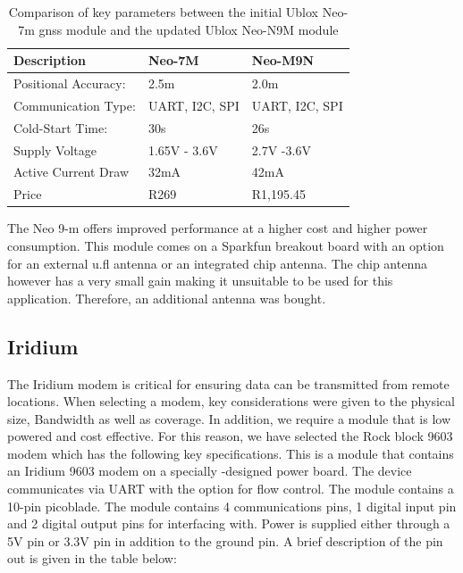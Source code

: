 \begin{table}[H]
    \centering
    \caption{Comparison of key parameters between the initial Ublox Neo-7m gnss module and the updated Ublox Neo-N9M module}
    \begin{tabular}{|l |l |l|}
    \hline
        \textbf{Description} & Neo-7M & Neo-M9N\\
        \hline
         Positional Accuracy: & 2.5m  & 2.0m\\
         Communication Type: & UART, I2C, SPI & UART, I2C, SPI\\
         Cold-Start Time:& 30s & 26s\\
         Supply Voltage & 1.65V - 3.6V & 2.7V -3.6V\\
         Active Current Draw & 32mA &  42mA\\
         Price & R269 \footnotemark & R1,195.45 \footnotemark\\
         \hline
    \end{tabular}
    \label{tab:neo7}
\end{table}
The Neo 9-m offers improved performance at a higher cost and higher power consumption. This module comes on a Sparkfun breakout board with an option for an external u.fl antenna or an integrated chip antenna. The chip antenna however has a very small gain making it unsuitable to be used for this application. Therefore, an additional antenna was bought.

\subsection{Iridium}

The Iridium modem is critical for ensuring data can be transmitted from remote locations. When selecting a modem, key considerations were given to the physical size, Bandwidth as well as coverage. In addition, we require a module that is low powered and cost effective. For this reason, we have selected the Rock block 9603 modem which has the following key specifications. This is a module that contains an Iridium 9603 modem on a specially -designed power board. The device communicates via UART with the option for flow control. The module contains a 10-pin picoblade. The module contains 4 communications pins, 1 digital input pin and 2 digital output pins for interfacing with. Power is supplied either through a 5V pin or 3.3V pin in addition to the ground pin. A brief description of the pin out is given in the table below: 

